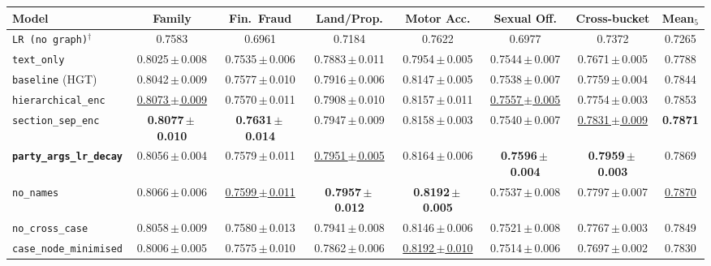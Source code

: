 \begin{table}[H]
  \centering
  \scriptsize
  \setlength{\tabcolsep}{3pt}
  \begin{adjustbox}{max width=\textwidth}
  \begin{tabular}{lccccccc}
    \toprule
    Model & Family & Fin.\ Fraud & Land/Prop. & Motor Acc. & Sexual Off. & Cross-bucket & Mean$_5$ \\
    \midrule
    \texttt{LR (no graph)}$^{\dagger}$       & 0.7583               & 0.6961               & 0.7184               & 0.7622               & 0.6977               & 0.7372               & 0.7265 \\
    \texttt{text\_only}                      & 0.8025\,$\pm$\,0.008 & 0.7535\,$\pm$\,0.006 & 0.7883\,$\pm$\,0.011 & 0.7954\,$\pm$\,0.005 & 0.7544\,$\pm$\,0.007 & 0.7671\,$\pm$\,0.005 & 0.7788 \\
    \texttt{baseline} (HGT)                  & 0.8042\,$\pm$\,0.009 & 0.7577\,$\pm$\,0.010 & 0.7916\,$\pm$\,0.006 & 0.8147\,$\pm$\,0.005 & 0.7538\,$\pm$\,0.007 & 0.7759\,$\pm$\,0.004 & 0.7844 \\
    \texttt{hierarchical\_enc}               & \underline{0.8073\,$\pm$\,0.009} & 0.7570\,$\pm$\,0.011 & 0.7908\,$\pm$\,0.010 & 0.8157\,$\pm$\,0.011 & \underline{0.7557\,$\pm$\,0.005} & 0.7754\,$\pm$\,0.003 & 0.7853 \\
    \texttt{section\_sep\_enc}               & \textbf{0.8077\,$\pm$\,0.010} & \textbf{0.7631\,$\pm$\,0.014} & 0.7947\,$\pm$\,0.009 & 0.8158\,$\pm$\,0.003 & 0.7540\,$\pm$\,0.007 & \underline{0.7831\,$\pm$\,0.009} & \textbf{0.7871} \\
    \textbf{\texttt{party\_args\_lr\_decay}} & 0.8056\,$\pm$\,0.004 & 0.7579\,$\pm$\,0.011 & \underline{0.7951\,$\pm$\,0.005} & 0.8164\,$\pm$\,0.006 & \textbf{0.7596\,$\pm$\,0.004} & \textbf{0.7959\,$\pm$\,0.003} & 0.7869 \\
    \texttt{no\_names}                       & 0.8066\,$\pm$\,0.006 & \underline{0.7599\,$\pm$\,0.011} & \textbf{0.7957\,$\pm$\,0.012} & \textbf{0.8192\,$\pm$\,0.005} & 0.7537\,$\pm$\,0.008 & 0.7797\,$\pm$\,0.007 & \underline{0.7870} \\
    \texttt{no\_cross\_case}                 & 0.8058\,$\pm$\,0.009 & 0.7580\,$\pm$\,0.013 & 0.7941\,$\pm$\,0.008 & 0.8146\,$\pm$\,0.006 & 0.7521\,$\pm$\,0.008 & 0.7767\,$\pm$\,0.003 & 0.7849 \\
    \texttt{case\_node\_minimised}           & 0.8006\,$\pm$\,0.005 & 0.7575\,$\pm$\,0.010 & 0.7862\,$\pm$\,0.006 & \underline{0.8192\,$\pm$\,0.010} & 0.7514\,$\pm$\,0.006 & 0.7697\,$\pm$\,0.002 & 0.7830 \\

\end{tabular}
\end{adjustbox}
\end{table}
